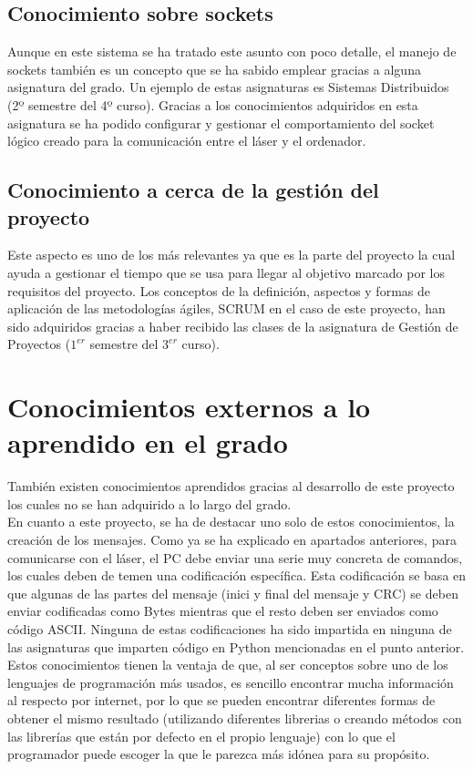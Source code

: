 \subsection{Conocimiento sobre sockets}
Aunque en este sistema se ha tratado este asunto con poco detalle, el manejo de sockets también es un concepto que se ha sabido emplear gracias a alguna asignatura del grado. Un ejemplo de estas asignaturas es Sistemas Distribuidos (2º semestre del 4º curso).
Gracias a los conocimientos adquiridos en esta asignatura se ha podido configurar y gestionar el comportamiento del socket lógico creado para la comunicación entre el láser y el ordenador.\\

\subsection{Conocimiento a cerca de la gestión del proyecto}
Este aspecto es uno de los más relevantes ya que es la parte del proyecto la cual ayuda a gestionar el tiempo que se usa para llegar al objetivo marcado por los requisitos del proyecto. Los conceptos de la definición, aspectos y formas de aplicación de las metodologías ágiles, SCRUM en el caso de este proyecto, han sido adquiridos gracias a haber recibido las clases de la asignatura de Gestión de Proyectos ($1^{er}$ semestre del $3^{er}$ curso).\\

\section{Conocimientos externos a lo aprendido en el grado}

También existen conocimientos aprendidos gracias al desarrollo de este proyecto los cuales no se han adquirido a lo largo del grado.\\
En cuanto a este proyecto, se ha de destacar uno solo de estos conocimientos, la creación de los mensajes. Como ya se ha explicado en apartados anteriores, para comunicarse con el láser, el PC debe enviar una serie muy concreta de comandos, los cuales deben de temen una codificación específica. Esta codificación se basa en que algunas de las partes del mensaje (inici y final del mensaje y CRC) se deben enviar codificadas como Bytes mientras que el resto deben ser enviados como código ASCII. Ninguna de estas codificaciones ha sido impartida en ninguna de las asignaturas que imparten código en Python mencionadas en el punto anterior.\\
Estos conocimientos tienen la ventaja de que, al ser conceptos sobre uno de los  lenguajes de programación más usados, es sencillo encontrar mucha información al respecto por internet, por lo que se pueden encontrar diferentes formas de obtener el mismo  resultado (utilizando diferentes librerias o creando métodos con las librerías que están por defecto en el propio lenguaje) con lo que el programador puede escoger la que le parezca más idónea para su propósito.